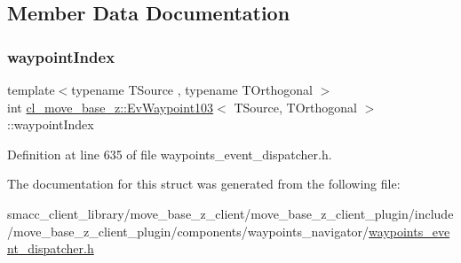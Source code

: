 \subsection{Member Data Documentation}
\mbox{\label{structcl__move__base__z_1_1EvWaypoint103_af6e4fb249e3a1b28647c4680f1f59933}} 
\subsubsection{\texorpdfstring{waypoint\+Index}{waypointIndex}}
{\footnotesize\ttfamily template$<$typename T\+Source , typename T\+Orthogonal $>$ \\
int \hyperlink{structcl__move__base__z_1_1EvWaypoint103}{cl\+\_\+move\+\_\+base\+\_\+z\+::\+Ev\+Waypoint103}$<$ T\+Source, T\+Orthogonal $>$\+::waypoint\+Index}



Definition at line 635 of file waypoints\+\_\+event\+\_\+dispatcher.\+h.



The documentation for this struct was generated from the following file\+:\begin{DoxyCompactItemize}
\item 
smacc\+\_\+client\+\_\+library/move\+\_\+base\+\_\+z\+\_\+client/move\+\_\+base\+\_\+z\+\_\+client\+\_\+plugin/include/move\+\_\+base\+\_\+z\+\_\+client\+\_\+plugin/components/waypoints\+\_\+navigator/\hyperlink{waypoints__event__dispatcher_8h}{waypoints\+\_\+event\+\_\+dispatcher.\+h}\end{DoxyCompactItemize}
